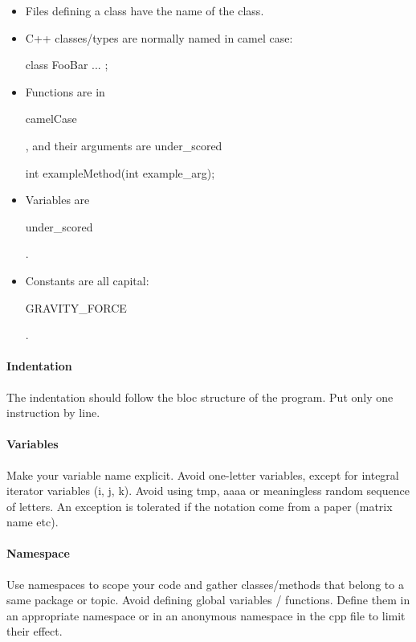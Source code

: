 \begin{itemize}
\item Files defining a class have the name of the class.
\item C++ classes/types are normally named in camel case:\\
\begin{tt}
class FooBar { ... };
\end{tt}
\item Functions are in \begin{tt}camelCase\end{tt}, and their arguments are under\_scored\\
\begin{tt}
int exampleMethod(int example\_arg);
\end{tt}

\item Variables are \begin{tt}under\_scored\end{tt}.

\item Constants are all capital: \begin{tt}GRAVITY\_FORCE\end{tt}.
\end{itemize}

\paragraph{Indentation}
The indentation should follow the bloc structure of the program.
Put only one instruction by line.

\paragraph{Variables}
Make your variable name explicit.
Avoid one-letter variables, except for integral iterator variables (i, j, k).
Avoid using tmp, aaaa or meaningless random sequence of letters.
An exception is tolerated if the notation come from a paper (matrix name etc). 

\paragraph{Namespace}
Use namespaces to scope your code and gather classes/methods that belong to a same package or topic.
Avoid defining global variables / functions. 
Define them in an appropriate namespace or in an anonymous namespace in the cpp file to limit their effect.

